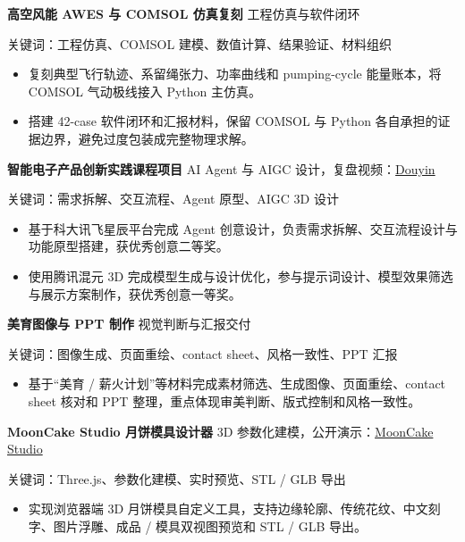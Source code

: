 \documentclass[UTF8,zihao=false]{ctexart}
\newcommand{\project}[4]{%
  \vspace{1.3pt}
  {\fontsize{8.95pt}{10.4pt}\selectfont\bfseries #1}
  \hfill
  {\fontsize{7.95pt}{9.2pt}\selectfont\color{muted}#2}\par
  {\fontsize{8.05pt}{9.3pt}\selectfont\color{muted}#3}\par
  \begin{itemize}
    #4
  \end{itemize}
}
\begin{document}
\project{高空风能 AWES 与 COMSOL 仿真复刻}{工程仿真与软件闭环}
{关键词：工程仿真、COMSOL 建模、数值计算、结果验证、材料组织}
{
  \item 复刻典型飞行轨迹、系留绳张力、功率曲线和 pumping-cycle 能量账本，将 COMSOL 气动极线接入 Python 主仿真。
  \item 搭建 42-case 软件闭环和汇报材料，保留 COMSOL 与 Python 各自承担的证据边界，避免过度包装成完整物理求解。
}

\project{智能电子产品创新实践课程项目}{AI Agent 与 AIGC 设计，复盘视频：\href{https://v.douyin.com/Bx2r1kX1LPo/}{Douyin}}
{关键词：需求拆解、交互流程、Agent 原型、AIGC 3D 设计}
{
  \item 基于科大讯飞星辰平台完成 Agent 创意设计，负责需求拆解、交互流程设计与功能原型搭建，获优秀创意二等奖。
  \item 使用腾讯混元 3D 完成模型生成与设计优化，参与提示词设计、模型效果筛选与展示方案制作，获优秀创意一等奖。
}

\project{美育图像与 PPT 制作}{视觉判断与汇报交付}
{关键词：图像生成、页面重绘、contact sheet、风格一致性、PPT 汇报}
{
  \item 基于“美育 / 薪火计划”等材料完成素材筛选、生成图像、页面重绘、contact sheet 核对和 PPT 整理，重点体现审美判断、版式控制和风格一致性。
}

\project{MoonCake Studio 月饼模具设计器}{3D 参数化建模，公开演示：\href{https://javonloong.github.io/Mooncake-Modle/}{MoonCake Studio}}
{关键词：Three.js、参数化建模、实时预览、STL / GLB 导出}
{
  \item 实现浏览器端 3D 月饼模具自定义工具，支持边缘轮廓、传统花纹、中文刻字、图片浮雕、成品 / 模具双视图预览和 STL / GLB 导出。
}
\end{document}
